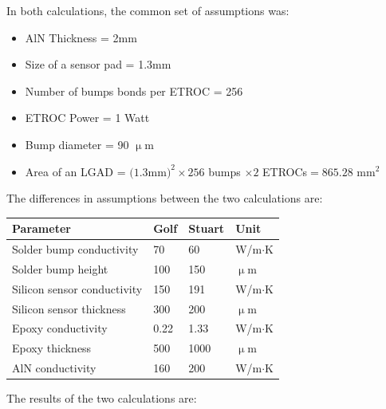 \documentclass[11pt]{article}
\begin{document}
In both calculations, the common set of assumptions was:

\begin{itemize}[noitemsep,topsep=-1em]
  \item AlN Thickness = 2mm
  \item Size of a sensor pad = 1.3mm
  \item Number of bumps bonds per ETROC = 256
  \item ETROC Power = 1 Watt
  \item Bump diameter = 90 $\upmu$m
  \item Area of an LGAD = $(1.3$mm$)^{2} \times 256$ bumps $ \times 2 $ ETROCs$= 865.28$ mm$^{2}$
\end{itemize}
\vspace{1em}

The differences in assumptions between the two calculations are:

\begin{center}
  \begin{tabular}{llll}
    \textbf{Parameter}                   & \textbf{Golf}          & \textbf{Stuart}          & \textbf{Unit} \\
    \midrule
    Solder bump conductivity    & 70            & 60              & W/m$\cdot$K    \\
    Solder bump height          & 100           & 150             & $\upmu$m      \\
    Silicon sensor conductivity & 150           & 191             & W/m$\cdot$K    \\
    Silicon sensor thickness    & 300           & 200             & $\upmu$m      \\
    Epoxy conductivity          & 0.22          & 1.33            & W/m$\cdot$K    \\
    Epoxy thickness             & 500           & 1000            & $\upmu$m      \\
    AlN conductivity            & 160           & 200             & W/m$\cdot$K    \\
  \end{tabular}
\end{center}

The results of the two calculations are:
\end{document}
